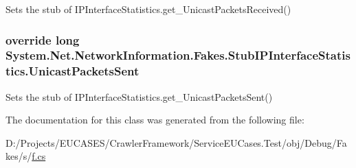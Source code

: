 Sets the stub of I\-P\-Interface\-Statistics.\-get\-\_\-\-Unicast\-Packets\-Received()

\hypertarget{class_system_1_1_net_1_1_network_information_1_1_fakes_1_1_stub_i_p_interface_statistics_a67564135636c51483044e906ead2937f}{
\subsubsection[{Unicast\-Packets\-Sent}]{\setlength{\rightskip}{0pt plus 5cm}override long System.\-Net.\-Network\-Information.\-Fakes.\-Stub\-I\-P\-Interface\-Statistics.\-Unicast\-Packets\-Sent\hspace{0.3cm}{\ttfamily [get]}}}\label{class_system_1_1_net_1_1_network_information_1_1_fakes_1_1_stub_i_p_interface_statistics_a67564135636c51483044e906ead2937f}


Sets the stub of I\-P\-Interface\-Statistics.\-get\-\_\-\-Unicast\-Packets\-Sent()



The documentation for this class was generated from the following file\-:\begin{DoxyCompactItemize}
\item 
D\-:/\-Projects/\-E\-U\-C\-A\-S\-E\-S/\-Crawler\-Framework/\-Service\-E\-U\-Cases.\-Test/obj/\-Debug/\-Fakes/s/\hyperlink{s_2f_8cs}{f.\-cs}\end{DoxyCompactItemize}
